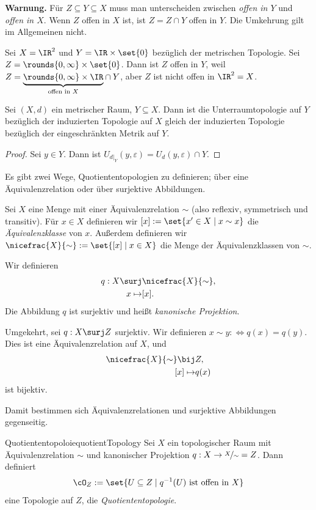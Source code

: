 \documentclass[language=ngerman]{TemplateLecture} %
\begin{document}
\textbf{Warnung.} Für $Z \subseteq Y \subseteq X$ muss man unterscheiden zwischen \emph{offen in $Y$} und \emph{offen in $X$}. Wenn $Z$ offen in $X$ ist, ist $Z = Z \cap Y$ offen in $Y$. Die Umkehrung gilt im Allgemeinen nicht.

Sei $X = \IR^2$ und $Y = \IR \times \set{0}$ bezüglich der metrischen Topologie. Sei $Z = \rounds{0, \infty} \times \set{0}$. Dann ist $Z$ offen in $Y$, weil $Z = \underset{\text{offen in $X$}}{\underbrace{\rounds{0,\infty} \times \IR}} \cap Y$, aber $Z$ ist nicht offen in $\IR^2 = X$.

\begin{remark}
    Sei $(X,d)$ ein metrischer Raum, $Y \subseteq X$. Dann ist die Unterraumtopologie auf $Y$ bezüglich der induzierten Topologie auf $X$ gleich der induzierten Topologie bezüglich der eingeschränkten Metrik auf $Y$.
\end{remark}

\begin{proof}
    Sei $y \in Y$. Dann ist $U_{d|_Y}(y, \varepsilon) = U_d(y, \varepsilon) \cap Y$.
\end{proof}

Es gibt zwei Wege, Quotiententopologien zu definieren; über eine Äquivalenzrelation oder über surjektive Abbildungen.

Sei $X$ eine Menge mit einer Äquivalenzrelation $\sim$ (also reflexiv, symmetrisch und transitiv). Für $x \in X$ definieren wir $[x] := \set{x' \in X \mid x \sim x}$ die \emph{Äquivalenzklasse} von $x$. Außerdem definieren wir $\nicefrac{X}{\sim} := \set{[x] \mid x \in X}$ die Menge der Äquivalenzklassen von $\sim$.

Wir definieren 
\begin{align*}
    q: X \surj& \nicefrac{X}{\sim}, \\
    x \mapsto& [x].   
\end{align*}
Die Abbildung $q$ ist surjektiv und heißt \emph{kanonische Projektion}.

Umgekehrt, sei $q: X \surj Z$ surjektiv. Wir definieren $x \sim y :\Leftrightarrow q(x) = q(y)$. Dies ist eine Äquivalenzrelation auf $X$, und 
\begin{align*}
    \nicefrac{X}{\sim} \bij& Z, \\
    [x] \mapsto & q(x)
\end{align*}
ist bijektiv.

Damit bestimmen sich Äquivalenzrelationen und surjektive Abbildungen gegenseitig.

\begin{thm}{Quotiententopoloie}{quotientTopology}
    Sei $X$ ein topologischer Raum mit Äquivalenzrelation $\sim$ und kanonischer Projektion $q: X \to \nicefrac{X}{\sim} = Z$. Dann definiert 
    \begin{equation*}
        \cO_Z := \set{U \subseteq Z \mid q^{-1}(U) \text{ ist offen in }X}
    \end{equation*}
    eine Topologie auf $Z$, die \emph{Quotiententopologie}.
\end{thm}
\end{document}
